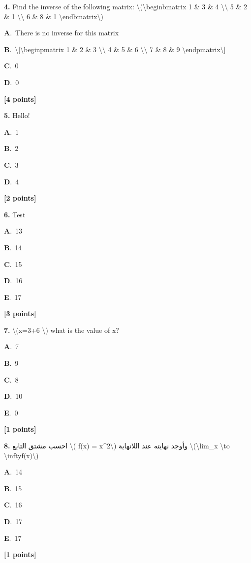 \documentclass[12pt]{article}
\newcommand{\choice}[3]{%
  \noindent\textbf{#1}.~#2\hfill#3\par\vspace{0.25em}
}
\begin{document}
\noindent \textbf{\textenglish{4.}} {\textenglish{Find the inverse of the following matrix: \textbackslash{}(\textbackslash{}begin{bmatrix} 1 \& 3 \& 4 \textbackslash{}\textbackslash{} 5 \& 2 \& 1 \textbackslash{}\textbackslash{} 6 \& 8 \& 1 \textbackslash{}end{bmatrix}\textbackslash{})}}

\noindent\choice{A}{{\textenglish{There is no inverse for this matrix}}}{}
\noindent\choice{B}{{\textenglish{\textbackslash{}[\textbackslash{}begin{pmatrix} 1 \& 2 \& 3 \textbackslash{}\textbackslash{} 4 \& 5 \& 6 \textbackslash{}\textbackslash{} 7 \& 8 \& 9  \textbackslash{}end{pmatrix}\textbackslash{}]}}}{}
\noindent\choice{C}{{\textenglish{0}}}{}
\noindent\choice{D}{{\textenglish{0}}}{}
\hfill \textbf{[4 points]}\vspace{0.5em}

\noindent \textbf{\textenglish{5.}} {\textenglish{Hello!}}

\noindent\choice{A}{{\textenglish{1}}}{}
\noindent\choice{B}{{\textenglish{2}}}{}
\noindent\choice{C}{{\textenglish{3}}}{}
\noindent\choice{D}{{\textenglish{4}}}{}
\hfill \textbf{[2 points]}\vspace{0.5em}

\noindent \textbf{\textenglish{6.}} {\textenglish{Test}}

\noindent\choice{A}{{\textenglish{13}}}{}
\noindent\choice{B}{{\textenglish{14}}}{}
\noindent\choice{C}{{\textenglish{15}}}{}
\noindent\choice{D}{{\textenglish{16}}}{}
\noindent\choice{E}{{\textenglish{17}}}{}
\hfill \textbf{[3 points]}\vspace{0.5em}

\noindent \textbf{\textenglish{7.}} {\textenglish{\textbackslash{}(x=3+6 \textbackslash{}) what is the value of x?}}

\noindent\choice{A}{{\textenglish{7}}}{}
\noindent\choice{B}{{\textenglish{9}}}{}
\noindent\choice{C}{{\textenglish{8}}}{}
\noindent\choice{D}{{\textenglish{10}}}{}
\noindent\choice{E}{{\textenglish{0}}}{}
\hfill \textbf{[1 points]}\vspace{0.5em}

\noindent \textbf{\textenglish{8.}} {\textarabic{احسب مشتق التابع \textbackslash{}( f(x) = x\^{}2\textbackslash{}) وأوجد نهايته عند اللانهاية \textbackslash{}(\textbackslash{}lim\_{x \textbackslash{}to \textbackslash{}infty}f(x)\textbackslash{})}}

\noindent\choice{A}{{\textenglish{14}}}{}
\noindent\choice{B}{{\textenglish{15}}}{}
\noindent\choice{C}{{\textenglish{16}}}{}
\noindent\choice{D}{{\textenglish{17}}}{}
\noindent\choice{E}{{\textenglish{17}}}{}
\hfill \textbf{[1 points]}\vspace{0.5em}
\end{document}
